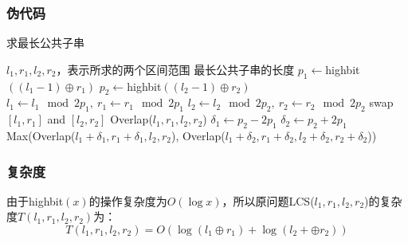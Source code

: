 \documentclass[UTF8]{ctexart}
\begin{document}
\subsubsection*{伪代码}
\begin{algorithm}
    \caption{求最长公共子串}
    \begin{algorithmic}[1]
        \Require $l_1, r_1, l_2, r_2$，表示所求的两个区间范围
        \Ensure 最长公共子串的长度
            \State $p_1 \gets$highbit$((l_1-1)\oplus r_1)$
            \State $p_2 \gets$highbit$((l_2-1)\oplus r_2)$
            \State $l_1 \gets l_1 \mod 2p_1,\ r_1\gets r_1\mod 2p_1$
            \State $l_2 \gets l_2 \mod 2p_2,\ r_2\gets r_2\mod 2p_2$
            \If{$\Sigma[p_1] > \Sigma[p_2]$}
                \State swap $[l_1, r_1]$ and $[l_2, r_2]$
            \EndIf
                \State \Return Overlap($l_1, r_1, l_2, r_2$)
            \Else
                \State $\delta_1\gets p_2-2p_1$
                \State $\delta_2\gets p_2+2p_1$
                \State \Return Max(Overlap($l_1+\delta_1, r_1+\delta_1, l_2, r_2$), Overlap($l_1+\delta_2, r_1+\delta_2, l_2+\delta_2, r_2+\delta_2$))
            \EndIf
        \EndFunction
    \end{algorithmic}
\end{algorithm}

\subsubsection*{复杂度}

由于highbit$(x)$的操作复杂度为$O(\log x)$，所以原问题LCS($l_1, r_1, l_2, r_2$)的复杂度$T(l_1, r_1, l_2, r_2)$为：
$$T(l_1, r_1, l_2, r_2)=O\left(\log\left(l_1\oplus r_1\right)+\log\left(l_2+\oplus r_2\right)\right)$$
\end{document}

